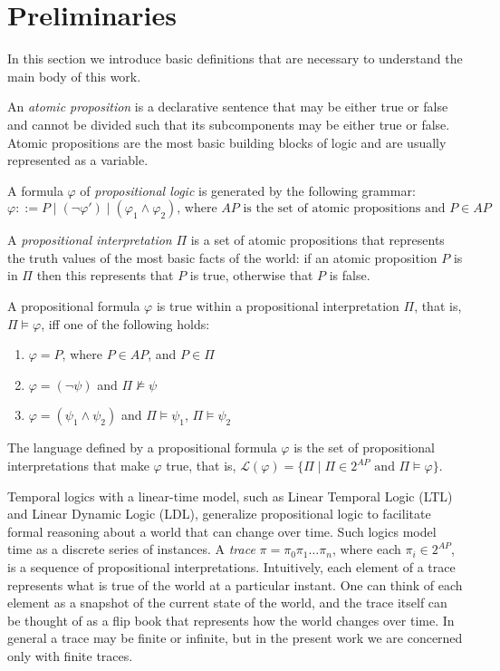 \documentclass[10pt,a4paper]{amsart}
\theoremstyle{plain}
\theoremstyle{definition}
\theoremstyle{definition}
\DeclareMathOperator{\?}{?}
\begin{document}
\section{Preliminaries}
\label{ch:preliminaries}

In this section we introduce basic definitions that are necessary to understand the main body of this work.

An \textit{atomic proposition} is a declarative sentence that may be either true or false and cannot be divided such that its subcomponents may be either true or false. Atomic propositions are the most basic building blocks of logic and are usually represented as a variable.

A formula $\varphi$ of \textit{propositional logic} is generated by the following grammar:
\[ \varphi::= P \mid (\neg\varphi') \mid (\varphi_1 \wedge \varphi_2)\text{, where $AP$ is the set of atomic propositions and }P \in AP\]

A \textit{propositional interpretation} $\Pi$ is a set of atomic propositions that represents the truth values of
the most basic facts of the world: if an atomic proposition $P$ is in $\Pi$
then this represents that $P$ is true, otherwise that $P$ is false.

A propositional formula $\varphi$ is true within a propositional interpretation $\Pi$, that is, $\Pi \models \varphi$, iff one of the following holds:
\begin{enumerate}
    \item $\varphi = P$, where $P \in AP$, and $P \in \Pi$
    \item $\varphi = (\neg\psi)$ and $\Pi \not\models \psi$
    \item $\varphi = (\psi_1 \wedge \psi_2)$ and $\Pi \models \psi_1$, $\Pi \models \psi_2$
\end{enumerate}

The language defined by a propositional formula $\varphi$ is the set of propositional interpretations that make $\varphi$ true,
that is, $\mathcal{L}(\varphi) = \{ \Pi \mid \Pi \in 2^{AP} \text{ and } \Pi \models \varphi \}$.

Temporal logics with a linear-time model, such as Linear Temporal Logic (LTL) and Linear Dynamic Logic (LDL), generalize
propositional logic to facilitate formal reasoning about a world that can change over time. Such logics model time as a
discrete series of instances. A \textit{trace} $\pi = \pi_0 \pi_1 \ldots \pi_n$, where each $\pi_i \in 2^{AP}$, is a sequence of propositional interpretations. Intuitively, each element
of a trace represents what is true of the world at a particular instant. One can think of each element as a snapshot of the
current state of the world, and the trace itself can be thought of as a flip book that represents how the world changes over time.
In general a trace may be finite or infinite, but in the present work we are concerned only with finite traces.
\end{document}
